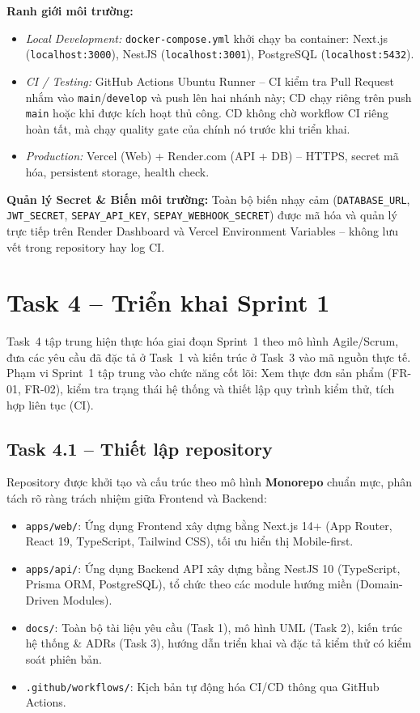 \documentclass[a4paper]{article}
\begin{document}
\textbf{Ranh giới môi trường:}
\begin{itemize}
    \item \textit{Local Development:} \texttt{docker-compose.yml} khởi chạy ba container: Next.js (\texttt{localhost:3000}), NestJS (\texttt{localhost:3001}), PostgreSQL (\texttt{localhost:5432}).
    \item \textit{CI / Testing:} GitHub Actions Ubuntu Runner -- CI kiểm tra Pull Request nhắm vào \texttt{main}/\texttt{develop} và push lên hai nhánh này; CD chạy riêng trên push \texttt{main} hoặc khi được kích hoạt thủ công. CD không chờ workflow CI riêng hoàn tất, mà chạy quality gate của chính nó trước khi triển khai.
    \item \textit{Production:} Vercel (Web) + Render.com (API + DB) -- HTTPS, secret mã hóa, persistent storage, health check.
\end{itemize}

\textbf{Quản lý Secret \& Biến môi trường:} Toàn bộ biến nhạy cảm (\texttt{DATABASE\_URL}, \texttt{JWT\_SECRET}, \texttt{SEPAY\_API\_KEY}, \texttt{SEPAY\_WEBHOOK\_SECRET}) được mã hóa và quản lý trực tiếp trên Render Dashboard và Vercel Environment Variables -- không lưu vết trong repository hay log CI.

\section{Task 4 – Triển khai Sprint 1}

Task~4 tập trung hiện thực hóa giai đoạn Sprint~1 theo mô hình Agile/Scrum, đưa các yêu cầu đã đặc tả ở Task~1 và kiến trúc ở Task~3 vào mã nguồn thực tế. Phạm vi Sprint~1 tập trung vào chức năng cốt lõi: Xem thực đơn sản phẩm (FR-01, FR-02), kiểm tra trạng thái hệ thống và thiết lập quy trình kiểm thử, tích hợp liên tục (CI).

\subsection{Task 4.1 – Thiết lập repository}

Repository được khởi tạo và cấu trúc theo mô hình \textbf{Monorepo} chuẩn mực, phân tách rõ ràng trách nhiệm giữa Frontend và Backend:

\begin{itemize}
    \item \texttt{apps/web/}: Ứng dụng Frontend xây dựng bằng Next.js 14+ (App Router, React 19, TypeScript, Tailwind CSS), tối ưu hiển thị Mobile-first.
    \item \texttt{apps/api/}: Ứng dụng Backend API xây dựng bằng NestJS 10 (TypeScript, Prisma ORM, PostgreSQL), tổ chức theo các module hướng miền (Domain-Driven Modules).
    \item \texttt{docs/}: Toàn bộ tài liệu yêu cầu (Task 1), mô hình UML (Task 2), kiến trúc hệ thống \& ADRs (Task 3), hướng dẫn triển khai và đặc tả kiểm thử có kiểm soát phiên bản.
    \item \texttt{.github/workflows/}: Kịch bản tự động hóa CI/CD thông qua GitHub Actions.
\end{itemize}
\end{document}
